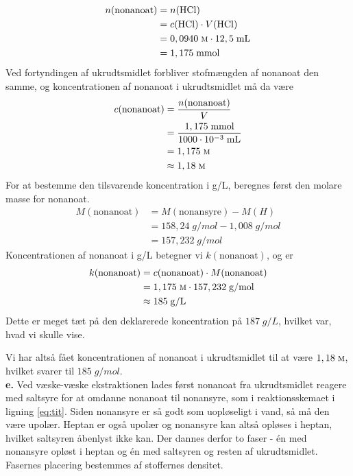 \documentclass{report}
\begin{document}
\begin{equation*}
\begin{split}
  n(\text{nonanoat})&=n(\ce{HCl} )\\
  &=c(\ce{HCl} ) \cdot V(\ce{HCl} )\\
  &=0,0940 \;\unit{\textsc{m}} \cdot 12,5 \;\unit{mL} \\
  &=1,175 \;\unit{mmol} 
\end{split}
\end{equation*}
Ved fortyndingen af ukrudtsmidlet forbliver stofmængden af nonanoat den samme, og koncentrationen af nonanoat i ukrudtsmidlet må da være
\begin{equation*}
\begin{split}
  c(\text{nonanoat} )&=\frac{n(\text{nonanoat} )}{V}\\
  &=\frac{1,175 \;\unit{mmol} }{1000 \cdot 10 ^{-3} \;\unit{mL} }\\
  &=1,175 \;\unit{\textsc{m}} \\
  &\approx 1,18 \;\unit{\textsc{m}} 
\end{split}
\end{equation*}
For at bestemme den tilsvarende koncentration i g/L, beregnes først den molare masse for nonanoat.
\begin{equation*}
\begin{split}
  M(\text{nonanoat} )&=M(\text{nonansyre} ) - M(H)\\
  &= 158,24 \;\unit{g/mol} - 1,008 \;\unit{g/mol}\\
  &=157,232 \;\unit{g/mol} 
\end{split}
\end{equation*}
Koncentrationen af nonanoat i g/L betegner vi $k(\text{nonanoat} )$, og er 
\begin{equation*}
\begin{split}
  k(\text{nonanoat} )&=c(\text{nonanoat} ) \cdot M(\text{nonanoat} )\\
  &=1,175 \;\unit{\textsc{m}} \cdot 157,232 \;\unit{g/mol} \\
  &\approx 185 \;\unit{g/L} 
\end{split}
\end{equation*}
Dette er meget tæt på den deklarerede koncentration på $187 \;\unit{g/L} $, hvilket var, hvad vi skulle vise.

Vi har altså fået koncentrationen af nonanoat i ukrudtsmidlet til at være $1,18 \;\unit{\textsc{m}}  $, hvilket svarer til $185 \;\unit{g/mol} $.\\[1ex]
\textbf{e.}
Ved væske-væske ekstraktionen lades først nonanoat fra ukrudtsmidlet reagere med saltsyre for at omdanne nonanoat til nonansyre, som i reaktionsskemaet i ligning \ref{eq:tit}.
Siden nonansyre er så godt som uopløseligt i vand, så må den være upolær.
Heptan er også upolær og nonansyre kan altså opløses i heptan, hvilket saltsyren åbenlyst ikke kan.
Der dannes derfor to faser - én med nonansyre opløst i heptan og én med saltsyren og resten af ukrudtsmidlet.
Fasernes placering bestemmes af stoffernes densitet.
\end{document}
